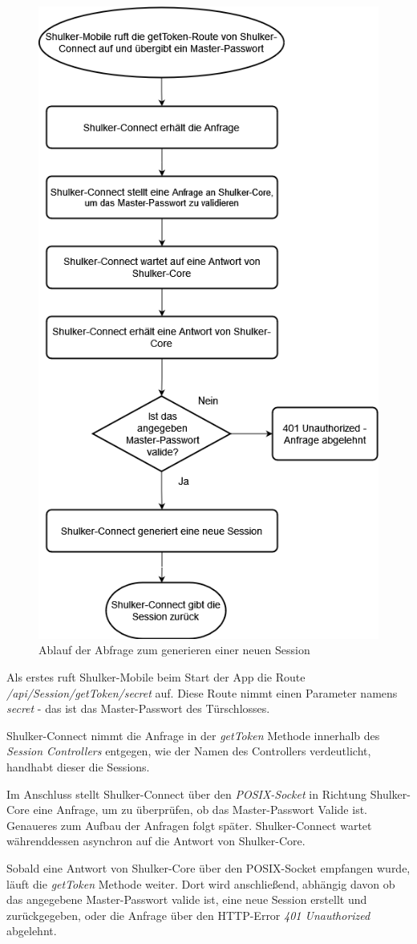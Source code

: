 \begin{figure}[H]
    \begin{center}
        \includegraphics[width=.6\textwidth]{images/connect/AblaufGetToken.png}
        \caption{Ablauf der Abfrage zum generieren einer neuen Session}
    \end{center}
\end{figure}

Als erstes ruft Shulker-Mobile beim Start der App die Route \textit{/api/Session/getToken/{secret}} auf.
Diese Route nimmt einen Parameter namens \textit{secret} - das ist das Master-Passwort des Türschlosses.

Shulker-Connect nimmt die Anfrage in der \textit{getToken} Methode innerhalb des \textit{Session Controllers} entgegen, 
wie der Namen des Controllers verdeutlicht, handhabt dieser die Sessions.

Im Anschluss stellt Shulker-Connect über den \textit{POSIX-Socket} in Richtung Shulker-Core eine Anfrage, um zu
überprüfen, ob das Master-Passwort Valide ist. Genaueres zum Aufbau der Anfragen folgt später.
Shulker-Connect wartet währenddessen asynchron auf die Antwort von Shulker-Core.

Sobald eine Antwort von Shulker-Core über den POSIX-Socket empfangen wurde, läuft die \textit{getToken} 
Methode weiter. Dort wird anschließend, abhängig davon ob das angegebene Master-Passwort valide ist, eine neue Session 
erstellt und zurückgegeben, oder die Anfrage über den HTTP-Error \textit{401 Unauthorized} abgelehnt.